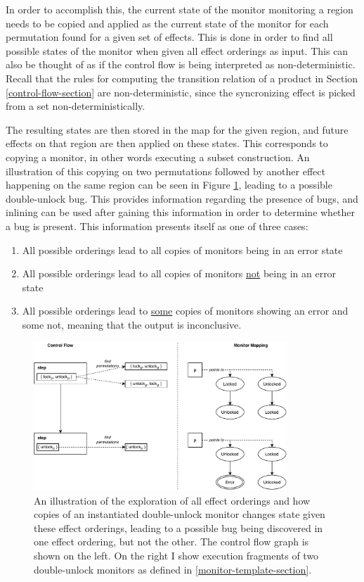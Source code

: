 \newpar In order to accomplish this, the current state of the monitor monitoring a region needs to be copied and applied as the current state of the monitor for each permutation found for a given set of effects. This is done in order to find all possible states of the monitor when given all effect orderings as input. This can also be thought of as if the control flow is being interpreted as non-deterministic. Recall that the rules for computing the transition relation of a product in Section \ref{control-flow-section} are non-deterministic, since the syncronizing effect is picked from a set non-deterministically.

\newpar The resulting states are then stored in the map for the given region, and future effects on that region are then applied on these states. This corresponds to copying a monitor, in other words executing a subset construction. An illustration of this copying on two permutations followed by another effect happening on the same region can be seen in Figure \ref{permutation-copy}, leading to a possible double-unlock bug. This provides information regarding the presence of bugs, and inlining can be used after gaining this information in order to determine whether a bug is present. This information presents itself as one of three cases: 

\begin{enumerate}
    \item All possible orderings lead to all copies of monitors being in an error state 
    \item All possible orderings lead to all copies of monitors \underline{not} being in an error state 
    \item All possible orderings lead to \underline{some} copies of monitors showing an error and some not, meaning that the output is inconclusive.
\end{enumerate}

\begin{figure}[H]
    \centering
    \includegraphics[width=0.85\textwidth]{implementation/figures/permutation-copy}
    \caption{An illustration of the exploration of all effect orderings and how copies of an instantiated double-unlock monitor changes state given these effect orderings, leading to a possible bug being discovered in one effect ordering, but not the other. The control flow graph is shown on the left. On the right I show execution fragments of two double-unlock monitors as defined in \ref{monitor-template-section}.}
    \label{permutation-copy}
\end{figure}

